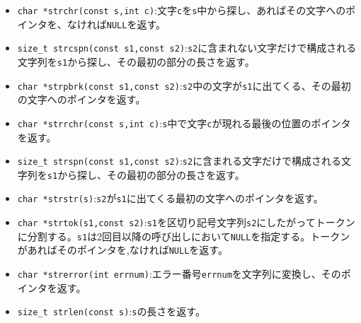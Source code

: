 \begin{itemize}
\item \verb|char *strchr(const s,int c)|:文字\verb|c|を\verb|s|中から探し、あればその文字へのポインタを、なければ\verb|NULL|を返す。
\item \verb|size_t strcspn(const s1,const s2)|:\verb|s2|に含まれない文字だけで構成される文字列を\verb|s1|から探し、その最初の部分の長さを返す。
\item \verb|char *strpbrk(const s1,const s2)|:\verb|s2|中の文字が\verb|s1|に出てくる、その最初の文字へのポインタを返す。
\item \verb|char *strrchr(const s,int c)|:\verb|s|中で文字\verb|c|が現れる最後の位置のポインタを返す。
\item \verb|size_t strspn(const s1,const s2)|:\verb|s2|に含まれる文字だけで構成される文字列を\verb|s1|から探し、その最初の部分の長さを返す。
\item \verb|char *strstr(s)|:\verb|s2|が\verb|s1|に出てくる最初の文字へのポインタを返す。
\item \verb|char *strtok(s1,const s2)|:\verb|s1|を区切り記号文字列\verb|s2|にしたがってトークンに分割する。\verb|s1|は2回目以降の呼び出しにおいて\verb|NULL|を指定する。トークンがあればそのポインタを,なければ\verb|NULL|を返す。
\item \verb|char *strerror(int errnum)|:エラー番号\verb|errnum|を文字列に変換し、そのポインタを返す。
\item \verb|size_t strlen(const s)|:\verb|s|の長さを返す。
\end{itemize}

